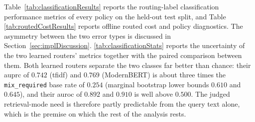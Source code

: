 \documentclass[english, bibtex]{kththesis}               %
\numberwithin{listing}{chapter}
\providecommand{\DIFaddtex}[1]{{\protect\color{blue} \sf #1}} %
\providecommand{\DIFdeltex}[1]{{\protect\color{red} \scriptsize #1}} %
\providecommand{\DIFaddbegin}{} %
\providecommand{\DIFaddend}{} %
\providecommand{\DIFdelbegin}{} %
\providecommand{\DIFdelend}{} %
\providecommand{\DIFadd}[1]{\texorpdfstring{\DIFaddtex{#1}}{#1}} %
\providecommand{\DIFdel}[1]{\texorpdfstring{\DIFdeltex{#1}}{}} %
\begin{document}
\DIFaddend Table~\ref{tab:classificationResults} reports \DIFaddbegin \DIFadd{the }\DIFaddend routing-label classification \DIFdelbegin \DIFdel{performance}\DIFdelend \DIFaddbegin \DIFadd{metrics of every policy on the held-out test split}\DIFaddend , and Table~\DIFdelbegin \DIFdel{\ref{tab:routedCostResults} reports offline routed cost and policy diagnostics. The asymmetry between the two error types is discussed in Section~\ref{sec:implDiscussion}. }\DIFdelend \DIFaddbegin \DIFadd{\ref{tab:classificationStats} reports the uncertainty of the two learned routers' metrics together with the paired comparison between them. Both learned routers separate the two classes far better than chance: their \gls{auprc} of $0.742$ (\gls{tfidf}) and $0.769$ (ModernBERT) is about three times the \texttt{mix\_required} base rate of $0.254$ (marginal bootstrap lower bounds $0.610$ and $0.645$), and their \gls{auroc} of $0.892$ and $0.910$ is well above $0.500$. The judged retrieval-mode need is therefore partly predictable from the query text alone, which is the premise on which the rest of the analysis rests.
}\DIFaddend 
\end{document}
